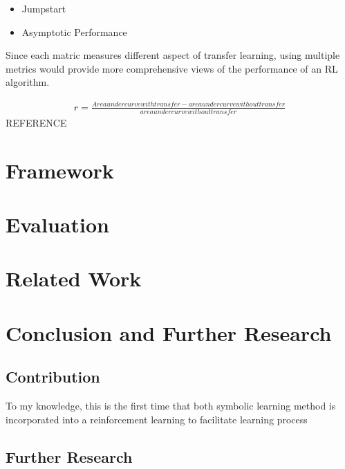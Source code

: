 \documentclass[12pt,twoside]{report}
\theoremstyle{plain}
\theoremstyle{definition}
\begin{document}


\begin{itemize}
\item Jumpstart
\item Asymptotic Performance
\end{itemize}

Since each matric measures different aspect of transfer learning, using multiple metrics would provide more comprehensive views of the performance of an RL algorithm.

\begin{equation}
\begin{split}
r = \frac{Area under curve with transfer - area under curve without transfer}{area under curve without transfer}
\end{split}
\end{equation}
REFERENCE


\chapter{Framework}
\label{framework}


\chapter{Evaluation}
\label{evaluation}




\chapter{Related Work}
\label{related_work}



\chapter{Conclusion and Further Research}
\label{conclusion_further_research}

\section{Contribution}
\label{contribution}

 To my knowledge, this is the first time that both symbolic learning method is incorporated into a reinforcement learning to facilitate learning process

\section{Further Research}
\label{further_research}
\end{document}
